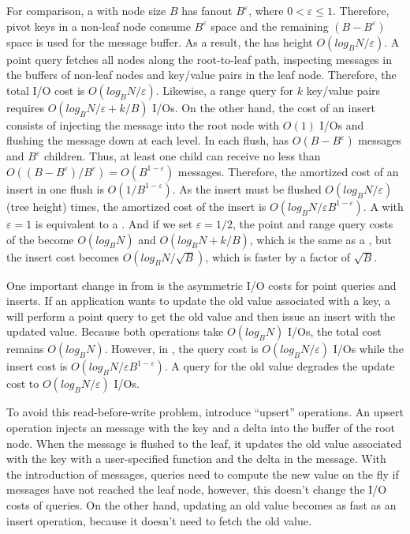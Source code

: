 For comparison, a \bet with node size $B$ has fanout $B^{\varepsilon}$, where
$0 < \varepsilon \leq 1$.
Therefore, pivot keys in a non-leaf node consume $B^{\varepsilon}$ space and
the remaining $(B - B^{\varepsilon})$ space is used for the message buffer.
As a result, the \bet has height $O(log_{B}{N}/\varepsilon)$.
A point query fetches all nodes along the root-to-leaf path,
inspecting messages in the buffers of non-leaf nodes and key/value pairs in the
leaf node.
Therefore, the total I/O cost is $O(log_{B}{N}/\varepsilon)$.
Likewise,  a range query for $k$ key/value pairs
requires $O({log_{B}{N}}/{\varepsilon} + k/B)$ I/Os.
On the other hand, the cost of an insert consists of injecting the message into
the root node with $O(1)$ I/Os and flushing the message down at each level.
In each flush, \bets has $O(B - B^{\varepsilon})$ messages and $B^{\varepsilon}$
children.
Thus, at least one child can receive no less than
$O((B - B^{\varepsilon})/B^{\varepsilon}) = O(B^{1 - \varepsilon})$ messages.
Therefore, the amortized cost of an insert in one flush is
$O(1/B^{1 - \varepsilon})$.
As the insert must be flushed $O(log_{B}{N}/\varepsilon)$ (tree height) times,
the amortized cost of the insert is
$O({log_{B}{N}}/{\varepsilon B^{1 - \varepsilon}})$.
A \bet with $\varepsilon = 1$ is equivalent to a \btree.
And if we set $\varepsilon = 1/2$, the point and range query costs of the \bet
become $O(log_{B}{N})$ and $O(log_{B}{N} + k/B)$, which is the same as a \btree,
but the insert cost becomes $O(log_{B}{N}/{\sqrt{B}})$, which is faster by a
factor of $\sqrt{B}$.

One important change in \bets from \btrees is the asymmetric I/O costs for
point queries and inserts.
If an application wants to update the old value associated with a key,
a \btree will perform a point query to get the old value and then issue an
insert with the updated value.
Because both operations take $O(log_{B}{N})$ I/Os, the total cost remains
$O(log_{B}{N})$.
However, in \bets, the query cost is $O(log_{B}{N}/\varepsilon)$ I/Os while the
insert cost is $O({log_{B}{N}}/{\varepsilon B^{1 - \varepsilon}})$.
A query for the old value degrades the update cost to
$O(log_{B}{N}/\varepsilon)$ I/Os.

To avoid this read-before-write problem, \bets introduce ``upsert'' operations.
An upsert operation injects an \upsertm message with the key and a delta into the
buffer of the root node.
When the \upsertm message is flushed to the leaf, it updates the old value
associated with the key with a user-specified function and the delta in the
message.
With the introduction of \upsertm messages,
queries need to compute the new value on the fly if \upsertm messages have not
reached the leaf node,
however, this doesn't change the I/O costs of queries.
On the other hand, updating an old value becomes as fast as an insert operation,
because it doesn't need to fetch the old value.


